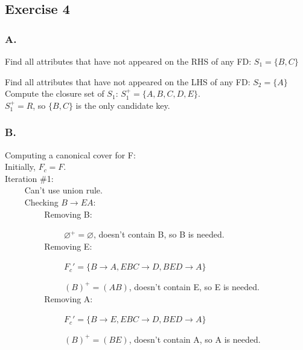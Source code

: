 \documentclass[a4paper]{article}
\begin{document}
\subsection*{Exercise 4}

\subsubsection*{A.}

Find all attributes that have not appeared on the RHS of any FD: $ S_1 = \{B,C\}$ 

Find all attributes that have not appeared on the LHS of any FD: $ S_2 = \{A\}$ \\

Compute the closure set of $S_1$: $S_1^+ = \{A, B, C, D, E\}$. \\

$ S_1^+ = R $, so $ \{B, C\} $ is the only candidate key.  


\subsubsection*{B.}

Computing a canonical cover for F: \\

Initially, $ F_c = F $. \\

	Iteration \#1: \\
	
	~~~~ Can't use union rule. \\
	
	~~~~ Checking $B\rightarrow EA:$  \\
	
	~~~~ ~~~~ Removing B: 
	
	~~~~ ~~~~ ~~~~ $ \varnothing^+=\varnothing $, doesn't contain B, so B is needed. \\
	
	~~~~ ~~~~ 	Removing E: 
	
	~~~~ ~~~~ ~~~~ $ F_c'=\{B\rightarrow A, EBC \rightarrow D, BED \rightarrow A\}$ 
	
	~~~~ ~~~~ ~~~~ $ (B)^+=(AB) $, doesn't contain E, so E is needed. \\
				
	~~~~ ~~~~ 	Removing A: 
	
	~~~~ ~~~~ ~~~~ $ F_c'=\{B\rightarrow E, EBC \rightarrow D, BED \rightarrow A\}$ 
	
	~~~~ ~~~~ ~~~~ $ (B)^+=(BE) $, doesn't contain A, so A is needed. \\
				
\end{document}
